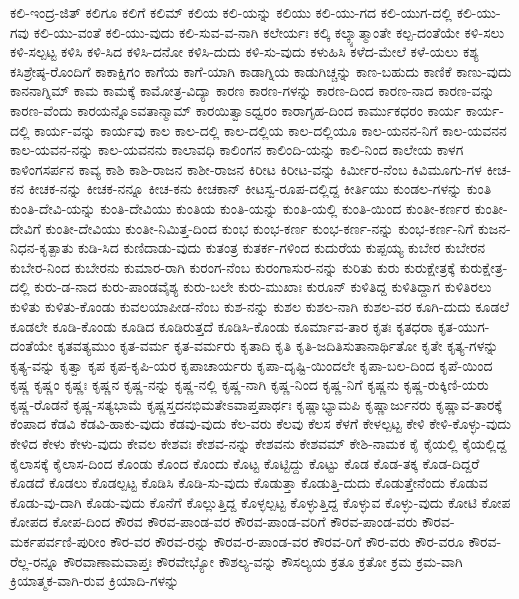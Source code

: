 {ಕಲಿ-ಇಂದ್ರ-ಜಿತ್
ಕಲಿಗೂ
ಕಲಿಗೆ
ಕಲಿಮ್
ಕಲಿಯ
ಕಲಿ-ಯನ್ನು
ಕಲಿಯು
ಕಲಿ-ಯು-ಗದ
ಕಲಿ-ಯುಗ-ದಲ್ಲಿ
ಕಲಿ-ಯು-ಗವು
ಕಲಿ-ಯು-ವಂತೆ
ಕಲಿ-ಯು-ವುದು
ಕಲಿ-ಸುವ-ವ-ನಾಗಿ
ಕಲೇರ್ಯಃ
ಕಲ್ಕಿ
ಕಲ್ಕ್ಯಾತ್ಮಾಂತೇ
ಕಲ್ಪ-ದಂತೆಯೇ
ಕಳಿ-ಸಲು
ಕಳಿ-ಸಲ್ಪಟ್ಟ
ಕಳಿಸಿ
ಕಳಿ-ಸಿದ
ಕಳಿಸಿ-ದನೋ
ಕಳಿಸಿ-ದುದು
ಕಳಿ-ಸು-ವುದು
ಕಳುಹಿಸಿ
ಕಳೆದ-ಮೇಲೆ
ಕಳೆ-ಯಲು
ಕಶ್ಯ
ಕಸಿಶ್ರೇಷ್ಠ-ರೊಂದಿಗೆ
ಕಾಕಾಕ್ಷಿಗಂ
ಕಾಗೆಯ
ಕಾಗೆ-ಯಾಗಿ
ಕಾಡಾಗ್ನಿಯ
ಕಾಡುಗಿಚ್ಚನ್ನು
ಕಾಣ-ಬಹುದು
ಕಾಣಿಕೆ
ಕಾಣು-ವುದು
ಕಾನನಾಗ್ನಿಮ್
ಕಾಮ
ಕಾಮಕ್ಕೆ
ಕಾಮೋತ್ರ-ವಿದ್ಯಾ
ಕಾರಣ
ಕಾರಣ-ಗಳನ್ನು
ಕಾರಣ-ದಿಂದ
ಕಾರಣ-ನಾದ
ಕಾರಣ-ವನ್ನು
ಕಾರಣ-ವೆಂದು
ಕಾರಯನ್ನೊಽವತಾನ್ಮಾಮ್
ಕಾರಯಿತ್ವಾಽಧ್ವರಂ
ಕಾರಾಗೃಹ-ದಿಂದ
ಕಾರ್ಮುಕಧರಂ
ಕಾರ್ಯ
ಕಾರ್ಯ-ದಲ್ಲಿ
ಕಾರ್ಯ-ವನ್ನು
ಕಾರ್ಯವು
ಕಾಲ
ಕಾಲ-ದಲ್ಲಿ
ಕಾಲ-ದಲ್ಲಿಯ
ಕಾಲ-ದಲ್ಲಿಯೂ
ಕಾಲ-ಯನನ-ನಿಗೆ
ಕಾಲ-ಯವನನ
ಕಾಲ-ಯವನ-ನನ್ನು
ಕಾಲ-ಯವನನು
ಕಾಲಾವಧಿ
ಕಾಲಿಂಗನ
ಕಾಲಿಂದಿ-ಯನ್ನು
ಕಾಲಿ-ನಿಂದ
ಕಾಲೇಯ
ಕಾಳಗ
ಕಾಳಿಂಗಸರ್ಪನ
ಕಾವ್ಯ
ಕಾಶಿ
ಕಾಶಿ-ರಾಜನ
ಕಾಶೀ-ರಾಜನ
ಕಿರೀಟ
ಕಿರೀಟ-ವನ್ನು
ಕಿರ್ಮೀರ-ನೆಂಬ
ಕಿವಿಮೂಗು-ಗಳ
ಕೀಚ-ಕನ
ಕೀಚಕ-ನನ್ನು
ಕೀಚಕ-ನನ್ನೂ
ಕೀಚ-ಕನು
ಕೀಚಕಾನ್
ಕೀಟಸ್ವ-ರೂಪ-ದಲ್ಲಿದ್ದ
ಕೀರ್ತಿಯು
ಕುಂಡಲ-ಗಳನ್ನು
ಕುಂತಿ
ಕುಂತಿ-ದೇವಿ-ಯನ್ನು
ಕುಂತಿ-ದೇವಿಯು
ಕುಂತಿಯ
ಕುಂತಿ-ಯನ್ನು
ಕುಂತಿ-ಯಲ್ಲಿ
ಕುಂತಿ-ಯಿಂದ
ಕುಂತೀ-ಕರ್ಣರ
ಕುಂತೀ-ದೇವಿಗೆ
ಕುಂತೀ-ದೇವಿಯು
ಕುಂತೀ-ನಿಮಿತ್ತ-ದಿಂದ
ಕುಂಭ
ಕುಂಭ-ಕರ್ಣ
ಕುಂಭ-ಕರ್ಣ-ನನ್ನು
ಕುಂಭ-ಕರ್ಣ-ನಿಗೆ
ಕುಜನ-ನಿಧನ-ಕೃತ್ಪಾತು
ಕುಡಿ-ಸಿದ
ಕುಣಿದಾಡು-ವುದು
ಕುತಂತ್ರ
ಕುತರ್ಕ-ಗಳಿಂದ
ಕುದುರೆಯ
ಕುಪ್ಪಯ್ಯ
ಕುಬೇರ
ಕುಬೇರನ
ಕುಬೇರ-ನಿಂದ
ಕುಬೇರನು
ಕುಮಾರ-ರಾಗಿ
ಕುರಂಗ-ನೆಂಬ
ಕುರಂಗಾಸುರ-ನನ್ನು
ಕುರಿತು
ಕುರು
ಕುರುಕ್ಷೇತ್ರಕ್ಕೆ
ಕುರುಕ್ಷೇತ್ರ-ದಲ್ಲಿ
ಕುರು-ಡ-ನಾದ
ಕುರು-ಪಾಂಡವೈಶ್ಯ
ಕುರು-ಬಲೇ
ಕುರು-ಮುಖಾಃ
ಕುರೂನ್
ಕುಳಿತಿದ್ದ
ಕುಳಿತಿದ್ದಾಗ
ಕುಳಿತಿರಲು
ಕುಳಿತು
ಕುಳಿತು-ಕೊಂಡು
ಕುವಲಯಾಪೀಡ-ನೆಂಬ
ಕುಶ-ನನ್ನು
ಕುಶಲ
ಕುಶಲ-ನಾಗಿ
ಕುಶಲ-ವರ
ಕೂಗಿ-ದುದು
ಕೂಡಲೆ
ಕೂಡಲೇ
ಕೂಡಿ-ಕೊಂಡು
ಕೂಡಿದ
ಕೂಡಿರುತ್ತದೆ
ಕೂಡಿಸಿ-ಕೊಂಡು
ಕೂರ್ಮಾವ-ತಾರ
ಕೃತಃ
ಕೃತಧರಾ
ಕೃತ-ಯುಗ-ದಂತೆಯೇ
ಕೃತವತ್ಯಮುಂ
ಕೃತ-ವರ್ಮ
ಕೃತ-ವರ್ಮರು
ಕೃತಾದಿ
ಕೃತಿ
ಕೃತಿ-ಜದಿತಿಸುತಾನಾರ್ಥಿತೋ
ಕೃತೇ
ಕೃತ್ಯ-ಗಳನ್ನು
ಕೃತ್ಯ-ವನ್ನು
ಕೃತ್ವಾ
ಕೃಪ
ಕೃಪ-ಕೃಪಿ-ಯರ
ಕೃಪಾಚಾರ್ಯರು
ಕೃಪಾ-ದೃಷ್ಟಿ-ಯಿಂದಲೇ
ಕೃಪಾ-ಬಲ-ದಿಂದ
ಕೃಪೆ-ಯಿಂದ
ಕೃಷ್ಣ
ಕೃಷ್ಣಂ
ಕೃಷ್ಣಃ
ಕೃಷ್ಣನ
ಕೃಷ್ಣ-ನನ್ನು
ಕೃಷ್ಣ-ನಲ್ಲಿ
ಕೃಷ್ಣ-ನಾಗಿ
ಕೃಷ್ಣ-ನಿಂದ
ಕೃಷ್ಣ-ನಿಗೆ
ಕೃಷ್ಣನು
ಕೃಷ್ಣ-ರುಕ್ಕಿಣಿ-ಯರು
ಕೃಷ್ಣ-ರೊಡನೆ
ಕೃಷ್ಣ-ಸತ್ಯಭಾಮೆ
ಕೃಷ್ಣಸ್ತದನಭಿಮತೇಽವಾಪ್ತಪಾರ್ಥಃ
ಕೃಷ್ಣಾಭ್ಯಾಮಪಿ
ಕೃಷ್ಣಾರ್ಜುನರು
ಕೃಷ್ಣಾವ-ತಾರಕ್ಕೆ
ಕೆಂಪಾದ
ಕೆಡವಿ
ಕೆಡವಿ-ಹಾಕು-ವುದು
ಕೆಡವು-ವುದು
ಕೆಲ-ವರು
ಕೆಲವು
ಕೆಲಸ
ಕೆಳಗೆ
ಕೇಳಲ್ಪಟ್ಟ
ಕೇಳಿ
ಕೇಳಿ-ಕೊಳ್ಳು-ವುದು
ಕೇಳಿದ
ಕೇಳು
ಕೇಳು-ವುದು
ಕೇವಲ
ಕೇಶವಃ
ಕೇಶವ-ನನ್ನು
ಕೇಶವನು
ಕೇಶವಮ್
ಕೇಶಿ-ನಾಮಕ
ಕೈ
ಕೈಯಲ್ಲಿ
ಕೈಯಲ್ಲಿದ್ದ
ಕೈಲಾಸಕ್ಕೆ
ಕೈಲಾಸ-ದಿಂದ
ಕೊಂಡು
ಕೊಂದ
ಕೊಂದು
ಕೊಟ್ಟ
ಕೊಟ್ಟಿದ್ದು
ಕೊಟ್ಟು
ಕೊಡ
ಕೊಡ-ತಕ್ಕ
ಕೊಡ-ದಿದ್ದರೆ
ಕೊಡದೆ
ಕೊಡಲು
ಕೊಡಲ್ಪಟ್ಟ
ಕೊಡಿಸಿ
ಕೊಡಿ-ಸು-ವುದು
ಕೊಡುತ್ತಾ
ಕೊಡುತ್ತಿ-ದುದು
ಕೊಡುತ್ತೇನೆಂದು
ಕೊಡುವ
ಕೊಡು-ವು-ದಾಗಿ
ಕೊಡು-ವುದು
ಕೊನೆಗೆ
ಕೊಲ್ಲುತ್ತಿದ್ದ
ಕೊಳ್ಳಲ್ಪಟ್ಟ
ಕೊಳ್ಳುತ್ತಿದ್ದ
ಕೊಳ್ಳುವ
ಕೊಳ್ಳು-ವುದು
ಕೋಟಿ
ಕೋಪ
ಕೋಪದ
ಕೋಪ-ದಿಂದ
ಕೌರವ
ಕೌರವ-ಪಾಂಡ-ವರ
ಕೌರವ-ಪಾಂಡ-ವರಿಗೆ
ಕೌರವ-ಪಾಂಡ-ವರು
ಕೌರವ-ಮರ್ಕಪರ್ವಣಿ-ಪುರೀಂ
ಕೌರ-ವರ
ಕೌರವ-ರನ್ನು
ಕೌರವ-ರ-ಪಾಂಡ-ವರ
ಕೌರವ-ರಿಗೆ
ಕೌರ-ವರು
ಕೌರ-ವರೂ
ಕೌರವ-ರೆಲ್ಲ-ರನ್ನೂ
ಕೌರವಾಣಾಮವಾಪ್ತಃ
ಕೌರವೇಭ್ಯೋ
ಕೌಶಲ್ಯ-ವನ್ನು
ಕೌಸಲ್ಯಯ
ಕ್ರತೂ
ಕ್ರತೋ
ಕ್ರಮ
ಕ್ರಮ-ವಾಗಿ
ಕ್ರಿಯಾತ್ಮಕ-ವಾಗಿ-ರುವ
ಕ್ರಿಯಾದಿ-ಗಳನ್ನು
}
